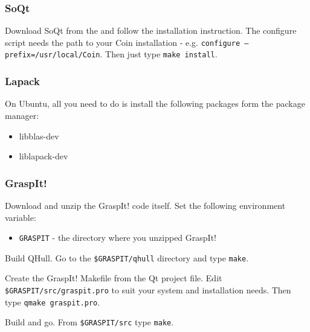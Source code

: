 \subsubsection{SoQt}

Download SoQt from the 
and follow the installation instruction. The configure script needs
the path to your Coin installation -
e.g. \texttt{configure~--prefix=/usr/local/Coin}. Then just type
\texttt{make install}.

\subsubsection{Lapack}

On Ubuntu, all you need to do is install the following packages form
the package manager:
\begin{itemize}
\item libblas-dev
\item liblapack-dev
\end{itemize}

\subsubsection{GraspIt!}

Download and unzip the GraspIt! code itself. Set the following
environment variable:

\begin{itemize}
\item \texttt{GRASPIT} - the directory where you unzipped GraspIt!
\end{itemize}

Build QHull. Go to the \texttt{\$GRASPIT/qhull} directory and type
\texttt{make}.

Create the GraspIt! Makefile from the Qt project file. Edit
\texttt{\$GRASPIT/src/graspit.pro} to suit your system and
installation needs. Then type \texttt{qmake graspit.pro}.

Build and go. From \texttt{\$GRASPIT/src} type \texttt{make}.
